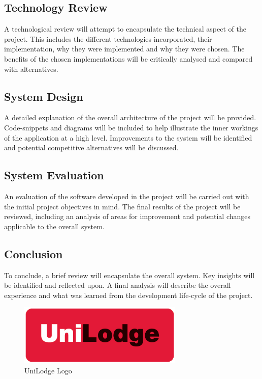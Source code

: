 \subsection{Technology Review}
A technological review will attempt to encapsulate the technical aspect of the project. This includes the different technologies incorporated, their implementation, why they were implemented and why they were chosen. The benefits of the chosen implementations will be critically analysed and compared with alternatives.
\subsection{System Design}
A detailed explanation of the overall architecture of the project will be provided. Code-snippets and diagrams will be included to help illustrate the inner workings of the application at a high level. Improvements to the system will be identified and potential competitive alternatives will be discussed.
\subsection{System Evaluation}
An evaluation of the software developed in the project will be carried out with the initial project objectives in mind. The final results of the project will be reviewed, including an analysis of areas for improvement and potential changes applicable to the overall system.
\subsection{Conclusion}
To conclude, a brief review will encapsulate the overall system. Key insights will be identified and reflected upon. A final analysis will describe the overall experience and what was learned from the development life-cycle of the project.

\begin{figure}[h!]
	\caption{UniLodge Logo}
	\label{image:myImageName}
	\centering
	\includegraphics[width=0.7\textwidth]{images/unilodge-logo.png}
\end{figure}	